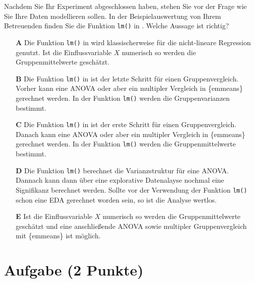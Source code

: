 \documentclass[a4paper, 9pt]{scrartcl}\usepackage[]{graphicx}\usepackage[]{xcolor}
\begin{document}
Nachdem Sie Ihr Experiment abgeschlossen haben, stehen Sie vor der Frage wie Sie Ihre Daten modellieren sollen. In der Beispielauswertung von Ihrem Betreuenden finden Sie die Funktion \texttt{lm()} in \Rlogo. Welche Aussage ist richtig?





\begin{enumerate}
\item [\textbf{A} \msquare] Die Funktion \texttt{lm()} in \Rlogo wird klassischerweise für die nicht-lineare Regression genutzt. Ist die Einflussvariable $X$ numerisch so werden die Gruppenmittelwerte geschätzt.
\item [\textbf{B} \msquare] Die Funktion \texttt{lm()} in \Rlogo ist der letzte Schritt für einen Gruppenvergleich. Vorher kann eine ANOVA oder aber ein multipler Vergleich in \{emmeans\} gerechnet werden. In der Funktion  \texttt{lm()} werden die Gruppenvarianzen bestimmt.
\item [\textbf{C} \msquare] Die Funktion \texttt{lm()} in \Rlogo ist der erste Schritt für einen Gruppenvergleich. Danach kann eine ANOVA oder aber ein multipler Vergleich in \{emmeans\} gerechnet werden. In der Funktion  \texttt{lm()} werden die Gruppenmittelwerte bestimmt.
\item [\textbf{D} \msquare] Die Funktion \texttt{lm()} berechnet die Varianzstruktur für eine ANOVA. Dannach kann dann über eine explorative Datenalayse nochmal eine Signifikanz berechnet werden. Sollte vor der Verwendung der Funktion \texttt{lm()} schon eine EDA gerechnet worden sein, so ist die Analyse wertlos.
\item [\textbf{E} \msquare] Ist die Einflussvariable $X$ numerisch so werden die Gruppenmittelwerte geschätzt und eine anschließende ANOVA sowie multipler Gruppenvergleich mit \{emmeans\} ist möglich.
\end{enumerate}

\section{Aufgabe \hfill (2 Punkte)}

\ifcollection
\begin{flushright}
\tiny\vspace{-2Ex}
\textbf{\examinhaltstart}
\exammodulebiostat
\vspace{-1Ex}
\end{flushright}
\fi
\end{document}
